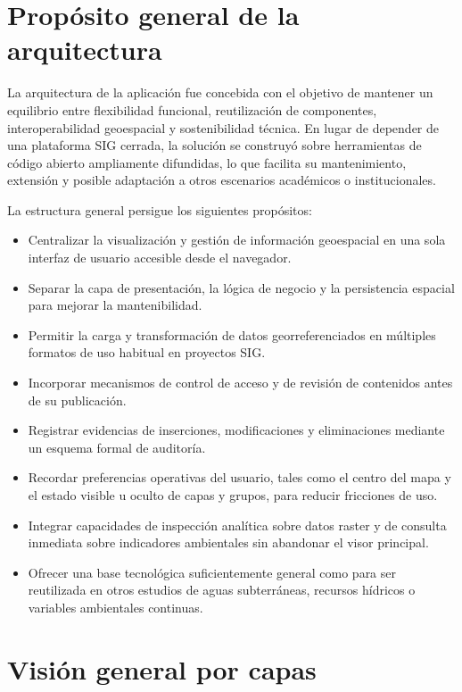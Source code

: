 \documentclass[12pt,a4paper]{report}
\begin{document}
\section{Prop\'osito general de la arquitectura}

La arquitectura de la aplicaci\'on fue concebida con el objetivo de mantener un equilibrio entre flexibilidad funcional, reutilizaci\'on de componentes, interoperabilidad geoespacial y sostenibilidad t\'ecnica. En lugar de depender de una plataforma SIG cerrada, la soluci\'on se construy\'o sobre herramientas de c\'odigo abierto ampliamente difundidas, lo que facilita su mantenimiento, extensi\'on y posible adaptaci\'on a otros escenarios acad\'emicos o institucionales.

La estructura general persigue los siguientes prop\'ositos:

\begin{itemize}
    \item Centralizar la visualizaci\'on y gesti\'on de informaci\'on geoespacial en una sola interfaz de usuario accesible desde el navegador.
    \item Separar la capa de presentaci\'on, la l\'ogica de negocio y la persistencia espacial para mejorar la mantenibilidad.
    \item Permitir la carga y transformaci\'on de datos georreferenciados en m\'ultiples formatos de uso habitual en proyectos SIG.
    \item Incorporar mecanismos de control de acceso y de revisi\'on de contenidos antes de su publicaci\'on.
    \item Registrar evidencias de inserciones, modificaciones y eliminaciones mediante un esquema formal de auditor\'ia.
    \item Recordar preferencias operativas del usuario, tales como el centro del mapa y el estado visible u oculto de capas y grupos, para reducir fricciones de uso.
    \item Integrar capacidades de inspecci\'on anal\'itica sobre datos raster y de consulta inmediata sobre indicadores ambientales sin abandonar el visor principal.
    \item Ofrecer una base tecnol\'ogica suficientemente general como para ser reutilizada en otros estudios de aguas subterr\'aneas, recursos h\'idricos o variables ambientales continuas.
\end{itemize}

\section{Visi\'on general por capas}
\end{document}

